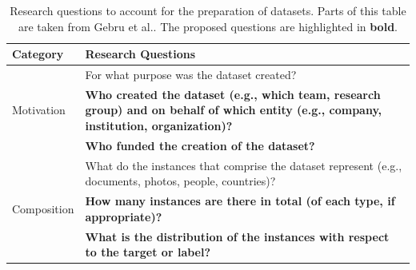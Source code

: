 \documentclass[journal]{IEEEtran}
\begin{document}
\begin{table}[]
\caption{\label{tab:datasheet} Research questions to account for the preparation of datasets. Parts of this table are taken from Gebru et al.\cite{gebru2021datasheets}. The proposed questions are highlighted in \textbf{bold}.}
\centering
\begin{tabular}{|p{}|p{}|}
\hline
\textbf{Category}                                & \textbf{Research Questions}                                                                                                                                                                                               \\ \hline
\multirow{3}{*}{Motivation}                      & For what purpose was the dataset created?                                                                                                                                                                                 \\
                                                 & \textbf{Who created the dataset (e.g., which team, research group) and on behalf of which entity (e.g., company, institution, organization)?}                                                                             \\
                                                 & \textbf{Who funded the creation of the dataset?}                                                                                                                                                                          \\ \hline
\multirow{13}{*}{Composition}                    & What do the instances that comprise the dataset represent (e.g., documents, photos, people, countries)?                                                                                                                   \\
                                                 & \textbf{How many instances are there in total (of each type, if appropriate)?}                                                                                                                                            \\
                                                 & \textbf{What is the distribution of the instances with respect to the target or label?}                                                                                                                                   \\

\end{tabular}
\end{table}
\end{document}
